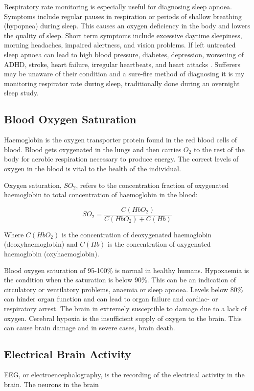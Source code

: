 \medskip

Respiratory rate monitoring is especially useful for diagnosing sleep apnoea. Symptoms include regular pauses in respiration or periods of shallow breathing (hypopnea) during sleep. This causes an oxygen deficiency in the body and lowers the quality of sleep. Short term symptoms include excessive daytime sleepiness, morning headaches, impaired alertness, and vision problems. If left untreated sleep apnoea can lead to high blood pressure, diabetes, depression, worsening of ADHD, stroke, heart failure, irregular heartbeats, and heart attacks \citep{webMDSleepApnoea}. Sufferers may be unaware of their condition and a sure-fire method of diagnosing it is my monitoring respirator rate during sleep, traditionally done during an overnight sleep study.

\subsection{Blood Oxygen Saturation}

Haemoglobin is the oxygen transporter protein found in the red blood cells of blood. Blood gets oxygenated in the lungs and then carries $O_2$ to the rest of the body for aerobic respiration necessary to produce energy. The correct levels of oxygen in the blood is vital to the health of the individual.

\medskip

Oxygen saturation, $SO_2$, refers to the concentration fraction of oxygenated haemoglobin to total concentration of haemoglobin in the blood:

$$SO_2  =  \frac{C(HbO_2)}{C(HbO_2)+C(Hb)}$$

Where $C(HbO_2)$ is the concentration of deoxygenated haemoglobin (deoxyhaemoglobin) and $C(Hb)$ is the concentration of oxygenated haemoglobin (oxyhaemoglobin).

\medskip

Blood oxygen saturation of 95-100\% is normal in healthy humans. Hypoxaemia is the condition when the saturation is below 90\%. This can be an indication of circulatory or ventilatory problems, anaemia or sleep apnoea. Levels below 80\% can hinder organ function and can lead to organ failure and cardiac- or respiratory arrest. The brain in extremely susceptible to damage due to a lack of oxygen. Cerebral hypoxia is the insufficient supply of oxygen to the brain. This can cause brain damage and in severe cases, brain death.

\subsection{Electrical Brain Activity}
EEG, or electroencephalography, is the recording of the electrical activity in the brain. The neurons in the brain



